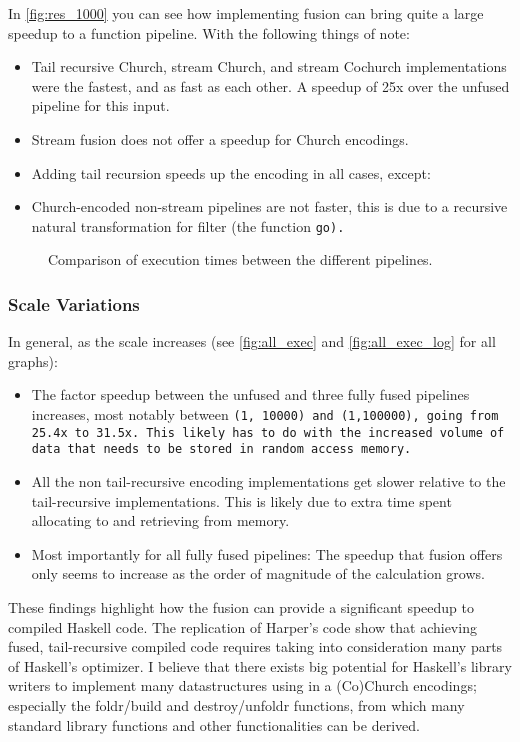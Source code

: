 In \autoref{fig:res_1000} you can see how implementing fusion can bring quite a large speedup to a function pipeline.
With the following things of note:
\begin{itemize}[noitemsep]
    \item Tail recursive Church, stream Church, and stream Cochurch implementations were the fastest, and as fast as each other. A speedup of 25x over the unfused pipeline for this input.
    \item Stream fusion does not offer a speedup for Church encodings.
    \item Adding tail recursion speeds up the encoding in all cases, except:
    \item Church-encoded non-stream pipelines are not faster, this is due to a recursive natural transformation for filter (the function \tt{go}).
\end{itemize}

\begin{figure}[h]
    
    \caption{Comparison of execution times between the different pipelines.}
    \label{fig:res_1000}
\end{figure}

\subsubsection{Scale Variations}\label{sec:scale_var}
In general, as the scale increases (see \autoref{fig:all_exec} and \autoref{fig:all_exec_log} for all graphs):
\begin{itemize}[noitemsep]
    \item The factor speedup between the unfused and three fully fused pipelines increases, most notably between \tt{(1, 10000)} and \tt{(1,100000)}, going from 25.4x to 31.5x.
    This likely has to do with the increased volume of data that needs to be stored in random access memory.
    \item All the non tail-recursive encoding implementations get slower relative to the tail-recursive implementations.
    This is likely due to extra time spent allocating to and retrieving from memory.
    \item Most importantly for all fully fused pipelines: The speedup that fusion offers only seems to increase as the order of magnitude of the calculation grows.
\end{itemize}

These findings highlight how the fusion can provide a significant speedup to compiled Haskell code.
The replication of Harper's code show that achieving fused, tail-recursive compiled code requires taking into consideration many parts of Haskell's optimizer.
I believe that there exists big potential for Haskell's library writers to implement many datastructures using in a (Co)Church encodings; especially the foldr/build and destroy/unfoldr functions, from which many standard library functions and other functionalities can be derived.

